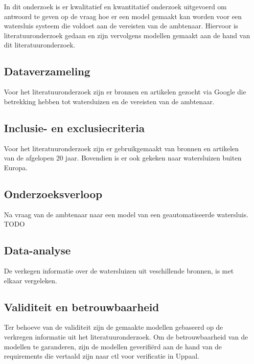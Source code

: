 \documentclass[../verslag.tex]{subfiles}
\begin{document}
In dit onderzoek is er kwalitatief en kwantitatief onderzoek uitgevoerd om antwoord te geven op de vraag hoe er een model gemaakt kan worden voor een watersluis systeem die voldoet aan de vereisten van de ambtenaar.
Hiervoor is literatuuronderzoek gedaan en zijn vervolgens modellen gemaakt aan de hand van dit literatuuronderzoek.

\subsection{Dataverzameling}
Voor het literatuuronderzoek zijn er bronnen en artikelen gezocht via Google die betrekking hebben tot watersluizen en de vereisten van de ambtenaar.

\subsection{Inclusie- en exclusiecriteria}
Voor het literatuuronderzoek zijn er gebruikgemaakt van bronnen en artikelen van de afgelopen 20 jaar. 
Bovendien is er ook gekeken naar watersluizen buiten Europa.
\subsection{Onderzoeksverloop}
Na vraag van de ambtenaar naar een model van een geautomatiseerde watersluis. TODO
\subsection{Data-analyse}
De verkegen informatie over de watersluizen uit veschillende bronnen, is met elkaar vergeleken.
\subsection{Validiteit en betrouwbaarheid}
Ter behoeve van de validiteit zijn de gemaakte modellen gebaseerd op de verkregen informatie uit het literatuuronderzoek.
Om de betrouwbaarheid van de modellen te garanderen, zijn de modellen geverifiërd aan de hand van de requirements die vertaald zijn naar ctl voor verificatie in Uppaal.
\end{document}
